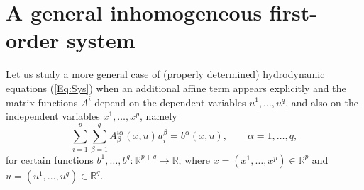 \documentclass{birkjour}
\theoremstyle{definition}
\theoremstyle{remark}
\numberwithin{equation}{section}
\numberwithin{equation}{section}
\numberwithin{thm}{section}
\numberwithin{equation}{section}
\numberwithin{thm}{section}
\begin{document}
\section{A general inhomogeneous first-order system}\label{sec:kGen}

Let us study a more general case of (properly determined) hydrodynamic equations (\ref{Eq:Sys}) when an additional affine term appears explicitly and the matrix functions $A^i$ depend on the dependent variables $u^1,\ldots,u^q$, and also on the independent variables $x^1,\ldots,x^p$, namely
\begin{equation}\label{Eq:InPDE}
	\sum_{i=1}^p\sum_{\beta=1}^qA^{i\alpha}_\beta(x,u)u^\beta_i=b^\alpha(x,u),\qquad \alpha=1,\ldots,q,
\end{equation}
for certain functions $b^1,\ldots,b^q:\mathbb{R}^{p+q}\rightarrow \mathbb{R}$, 
where $x=(x^1,\ldots,x^p)\in \mathbb{R}^p$ and $u=(u^1,\ldots,u^q)\in \mathbb{R}^q$.
\end{document}
